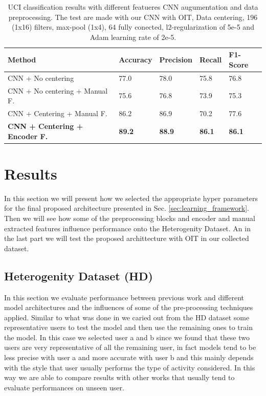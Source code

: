
\begin{table}[t]
	\begin{center}
		\begin{tabular}{ p{7cm}p{2cm}p{2cm}p{2cm}p{2cm} } 
			\hline
			Method & Accuracy & Precision & Recall & F1-Score \\ 
			\hline
			CNN + No centering & 77.0 & 78.0 & 75.8 & 76.8 \\ 
			CNN + No centering + Manual F. & 75.6 & 76.8 & 73.9 & 75.3 \\
			CNN + Centering + Manual F. & 86.2 & 86.9 & 70.2 & 77.6 \\ 
			\textbf{CNN + Centering + Encoder F.} & \textbf{89.2} & \textbf{88.9} &  \textbf{86.1} & \textbf{86.1} \\ 
			\hline
		\end{tabular}
		\caption{\label{tab:model-performance} UCI classification results with different featueres CNN augumentation and data preprocessing. The test are made with our CNN with OIT, Data centering, 196 (1x16) filters, max-pool (1x4), 64 fully conected, l2-regularization of 5e-5 and Adam learning rate of 2e-5.}
	\end{center}
\end{table}

\section{Results}
\label{sec:results}
In this section we will present how we selected the appropriate hyper parameters for the final proposed architecture presented in Sec. \ref{sec:learning_framework}. Then we will see how some of the preprocessing blocks and encoder and manual extracted features influence performance onto the Heterogenity Dataset. An in the last part we will test the proposed archittecture with OIT in our collected dataset.  

\subsection{Heterogenity Dataset (HD)}

In this section we evaluate performance between previous work and different model architectures and the influences of some of the pre-processing techniques applied. Similar to what was done in \cite{ignatov2018real} we caried out from the HD dataset some representative users to test the model and then use the remaining ones to train the model. In this case we selected user a and b since we found that these two users are very representative of all the remaining user, in fact models tend to be less precise with user a and more accurate with user b and this mainly depends with the style that user usually performs the type of activity considered. In this way we are able to compare results with other works that usually tend to evaluate performances on unseen user. 

